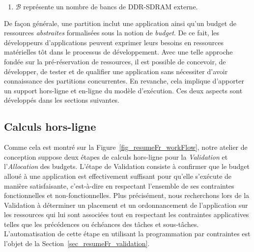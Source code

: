 \documentclass[main.tex]{subfiles}
\begin{document}
\begin{enumerate}
\begin{itemize}
            \end{itemize}

        \item $\mathcal{B}$ représente un nombre de bancs de DDR-SDRAM externe.
    \end{enumerate}

De façon générale, une partition inclut une application ainsi qu'un budget de ressources \emph{abstraites} formalisées sous la notion de \emph{budget}. De ce fait, les développeurs d'applications peuvent exprimer leurs besoins en ressources matérielles tôt dans le processus de développement. Avec une telle approche fondée sur la pré-réservation de ressources, il est possible de concevoir, de développer, de tester et de qualifier une application sans nécessiter d'avoir connaissance des partitions concurrentes. En revanche, cela implique d'apporter un support hors-ligne et en-ligne du modèle d'exécution. Ces deux aspects sont développés dans les sections suivantes.



\subsection{Calculs hors-ligne}
Comme cela est montré sur la Figure~\ref{fig_resumeFr_workFlow}, notre atelier de conception suppose deux étapes de calculs hors-ligne pour la \emph{Validation} et l'\emph{Allocation} des budgets. L'étape de Validation consiste à confirmer que le budget alloué à une application est effectivement suffisant pour qu'elle s'exécute de manière satisfaisante, c'est-à-dire en respectant l'ensemble de ses contraintes fonctionnelles et non-fonctionnelles. Plus précisément, nous recherchons lors de la Validation à déterminer un placement et un ordonnancement de l'application sur les ressources qui lui sont associées tout en respectant les contraintes applicatives telles que les précédences ou échéances des tâches et sous-tâches. L'automatisation de cette étape en utilisant la programmation par contraintes est l'objet de la Section~\ref{sec_resumeFr_validation}.
\end{document}
